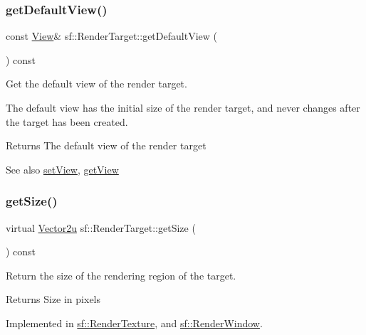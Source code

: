 \subsubsection{\texorpdfstring{get\+Default\+View()}{getDefaultView()}}
{\footnotesize\ttfamily const \hyperlink{classsf_1_1_view}{View}\& sf\+::\+Render\+Target\+::get\+Default\+View (\begin{DoxyParamCaption}{ }\end{DoxyParamCaption}) const}



Get the default view of the render target. 

The default view has the initial size of the render target, and never changes after the target has been created.

\begin{DoxyReturn}{Returns}
The default view of the render target
\end{DoxyReturn}
\begin{DoxySeeAlso}{See also}
\hyperlink{classsf_1_1_render_target_a063db6dd0a14913504af30e50cb6d946}{set\+View}, \hyperlink{classsf_1_1_render_target_a2c179503b4dcdf5282ef6426d317602c}{get\+View} 
\end{DoxySeeAlso}
\mbox{\label{classsf_1_1_render_target_a2e5ade2457d9fb4c4907ae5b3d9e94a5}} 
\subsubsection{\texorpdfstring{get\+Size()}{getSize()}}
{\footnotesize\ttfamily virtual \hyperlink{classsf_1_1_vector2}{Vector2u} sf\+::\+Render\+Target\+::get\+Size (\begin{DoxyParamCaption}{ }\end{DoxyParamCaption}) const\hspace{0.3cm}{\ttfamily [pure virtual]}}



Return the size of the rendering region of the target. 

\begin{DoxyReturn}{Returns}
Size in pixels 
\end{DoxyReturn}


Implemented in \hyperlink{classsf_1_1_render_texture_a6685315b5c4c25a5dcb75b4280b381ba}{sf\+::\+Render\+Texture}, and \hyperlink{classsf_1_1_render_window_ae3eacf93661c8068fca7a78d57dc7e14}{sf\+::\+Render\+Window}.

